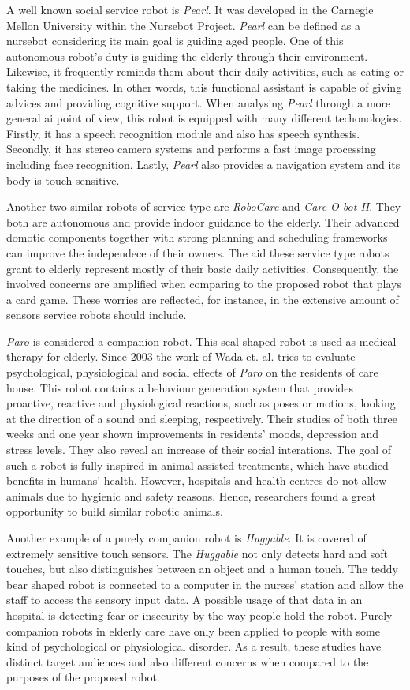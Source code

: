 A well known social service robot is \emph{Pearl}.
It was developed in the Carnegie Mellon University within the Nursebot Project.
\emph{Pearl} can be defined as a nursebot considering its main goal is guiding aged people.
One of this autonomous robot's duty is guiding the elderly through their environment.
Likewise, it frequently reminds them about their daily activities, such as eating or taking the medicines.
In other words, this functional assistant is capable of giving advices and providing cognitive support.
When analysing \emph{Pearl} through a more general \gls{ai} point of view, this robot is equipped with many different techonologies.
Firstly, it has a speech recognition module and also has speech synthesis.
Secondly, it has stereo camera systems and performs a fast image processing including face recognition.
Lastly, \emph{Pearl} also provides a navigation system and its body is touch sensitive.

Another two similar robots of service type are \emph{RoboCare} and \emph{Care-O-bot II}.
They both are autonomous and provide indoor guidance to the elderly.
Their advanced domotic components together with strong planning and scheduling frameworks can improve the independece of their owners.
The aid these service type robots grant to elderly represent mostly of their basic daily activities.
Consequently, the involved concerns are amplified when comparing to the proposed robot that plays a card game.
These worries are reflected, for instance, in the extensive amount of sensors service robots should include.

\emph{Paro} is considered a companion robot.
This seal shaped robot is used as medical therapy for elderly.
Since 2003 the work of Wada et. al. tries to evaluate psychological, physiological and social effects of \emph{Paro} on the residents of care house.
This robot contains a behaviour generation system that provides proactive, reactive and physiological reactions, such as poses or motions, looking at the direction of a sound and sleeping, respectively.
Their studies of both three weeks and one year shown improvements in residents' moods, depression and stress levels.
They also reveal an increase of their social interations.
The goal of such a robot is fully inspired in animal-assisted treatments, which have studied benefits in humans' health.
However, hospitals and health centres do not allow animals due to hygienic and safety reasons.
Hence, researchers found a great opportunity to build similar robotic animals.

Another example of a purely companion robot is \emph{Huggable}.
It is covered of extremely sensitive touch sensors.
The \emph{Huggable} not only detects hard and soft touches, but also distinguishes between an object and a human touch.
The teddy bear shaped robot is connected to a computer in the nurses' station and allow the staff to access the sensory input data.
A possible usage of that data in an hospital is detecting fear or insecurity by the way people hold the robot.
Purely companion robots in elderly care have only been applied to people with some kind of psychological or physiological disorder.
As a result, these studies have distinct target audiences and also different concerns when compared to the purposes of the proposed robot.


